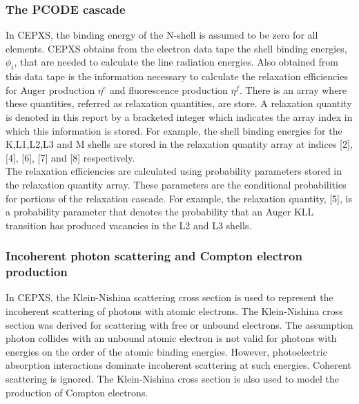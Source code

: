 \subsubsection{The PCODE cascade}
In CEPXS, the binding energy of the N-shell is assumed to be zero for all
elements. CEPXS obtains from the electron data tape the shell binding
energies, $\phi_i$, that are needed to calculate the line radiation energies.
Also obtained from this data tape is the information necessary to calculate
the relaxation efficiencies for Auger production $\eta^e$ and fluorescence
production $\eta^f$. There is an array where these quantities, referred as
relaxation quantities, are store. A relaxation quantity is denoted in this
report by a bracketed integer which indicates the array index in which this
information is stored. For example, the shell binding energies for the
K,L1,L2,L3 and M shells are stored in the relaxation quantity array at indices
[2], [4], [6], [7] and [8] respectively.\\
The relaxation efficiencies are calculated using probability parameters stored
in the relaxation quantity array. These parameters are the conditional
probabilities for portions of the relaxation cascade. For example, the
relaxation quantity, [5], is a probability parameter that denotes the
probability that an Auger KLL transition has produced vacancies in the L2 and
L3 shells.

\subsubsection{Incoherent photon scattering and Compton electron production}
In CEPXS, the Klein-Nishina scattering cross section is used to represent the
incoherent scattering of photons with atomic electrons. The Klein-Nishina
cross  section was derived for scattering with free or unbound electrons. The
assumption photon collides with an unbound atomic electron is not valid for
photons with energies on the order of the atomic binding energies. However,
photoelectric absorption interactions dominate incoherent scattering at such
energies. Coherent scattering is ignored. The Klein-Nishina cross section is
also used to model the production of Compton electrons.

